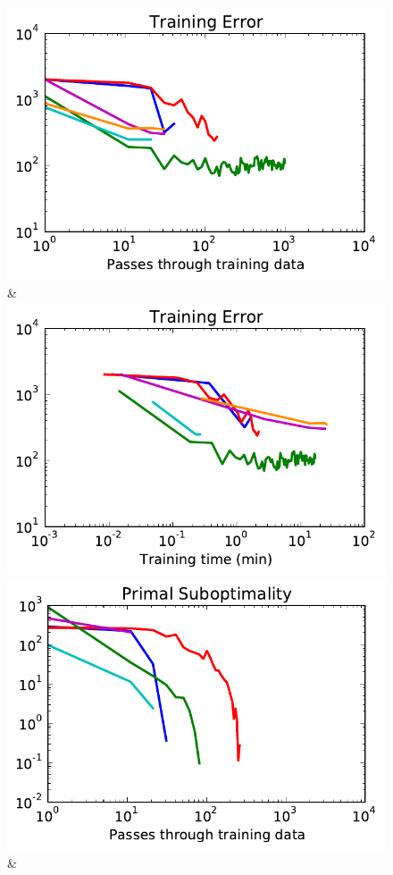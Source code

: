 \begin{figure}
\begin{tabu}
    \includegraphics[width=\linewidth]{evaluation/images/snakes_qpbo_loss}&%
    \includegraphics[width=\linewidth]{evaluation/images/snakes_qpbo_time_loss}\\
    \includegraphics[width=\linewidth]{evaluation/images/snakes_ad3}&%

\end{tabu}
\end{figure}
